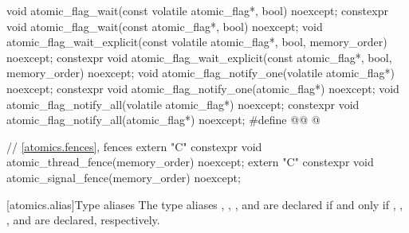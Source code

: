 \begin{codeblock}
{  void atomic_flag_wait(const volatile atomic_flag*, bool) noexcept;
  constexpr void atomic_flag_wait(const atomic_flag*, bool) noexcept;
  void atomic_flag_wait_explicit(const volatile atomic_flag*, bool, memory_order) noexcept;
  constexpr void atomic_flag_wait_explicit(const atomic_flag*, bool, memory_order) noexcept;
  void atomic_flag_notify_one(volatile atomic_flag*) noexcept;
  constexpr void atomic_flag_notify_one(atomic_flag*) noexcept;
  void atomic_flag_notify_all(volatile atomic_flag*) noexcept;
  constexpr void atomic_flag_notify_all(atomic_flag*) noexcept;
  #define @@ @\seebelownc@

  // \ref{atomics.fences}, fences
  extern "C" constexpr void atomic_thread_fence(memory_order) noexcept;
  extern "C" constexpr void atomic_signal_fence(memory_order) noexcept;
}
\end{codeblock}

[atomics.alias]{Type aliases}
%
%
%
%
%
%
%
%
%
%
%
%
%
%
%
%
%
%
%
%
%
%
%
%
%
%
%
%
%
%
%
%
%
%
%
%
%
%
%
%
%
%
%
%
%
%
\pnum
The type aliases , ,
, and 
are declared if and only if
, ,
, and 
are declared, respectively.

